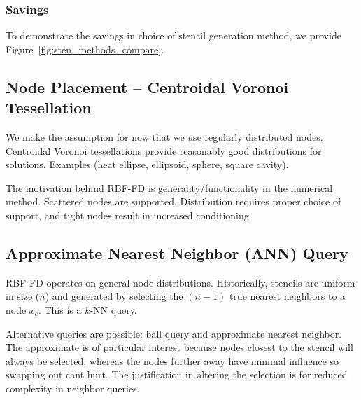 \documentclass[11pt]{report}
\begin{document}
{\subsubsection{Savings}
To demonstrate the savings in choice of stencil generation method, we provide Figure~\ref{fig:sten_methods_compare}. 





\subsection{Node Placement -- Centroidal Voronoi Tessellation}



We make the assumption for now that we use regularly distributed nodes. Centroidal Voronoi tessellations provide reasonably good distributions for solutions. Examples (heat ellipse, ellipsoid, sphere, square cavity).

The motivation behind RBF-FD is generality/functionality in the numerical method. Scattered nodes are supported. Distribution requires proper choice of support, and tight nodes result in increased conditioning

\subsection{Approximate Nearest Neighbor (ANN) Query}

RBF-FD operates on general node distributions. Historically, stencils are uniform in size ($n$) and generated by selecting the $(n-1)$ true nearest neighbors to a node $x_c$. This is a $k$-NN query. 

Alternative queries are possible: ball query and approximate nearest neighbor. The approximate is of particular interest because nodes closest to the stencil will always be selected, whereas the nodes further away have minimal influence so swapping out cant hurt. The justification in altering the selection is for reduced complexity in neighbor queries.  


}
\end{document}
